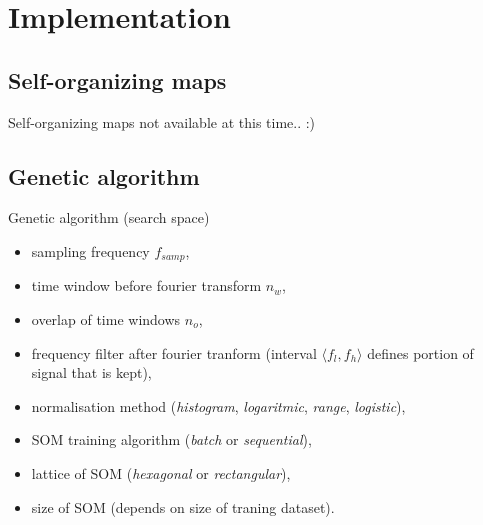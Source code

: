 \documentclass{beamer}
\begin{document}
\section{Implementation}
\subsection{Self-organizing maps}
\begin{frame}{Self-organizing maps}
\alert{not available at this time.. :)}
\end{frame}

\subsection{Genetic algorithm}

\begin{frame}{Genetic algorithm (search space)}
\begin{itemize}
	\item sampling frequency $ f_{samp} $,
	\item time window before fourier transform $ n_w $,
	\item overlap of time windows $ n_o $,
	\item frequency filter after fourier tranform (interval $ \langle f_l, f_h
	\rangle $ defines portion of signal that is kept),
	\item normalisation method (\textit{histogram}, \textit{logaritmic}, 
	\textit{range}, \textit{logistic}),
	\item SOM training algorithm (\textit{batch} or \textit{sequential}),
	\item lattice of SOM (\textit{hexagonal} or \textit{rectangular}),
	\item size of SOM (depends on size of traning dataset).
\end{itemize}
\end{frame}
\end{document}
